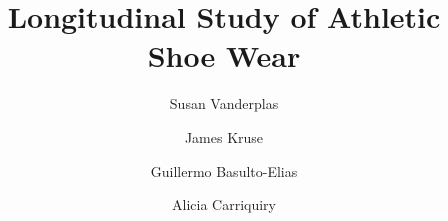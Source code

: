 \title{Longitudinal Study of Athletic Shoe Wear}



%
%


\author[unl,csafe]{Susan Vanderplas}
\author[jkaffil]{James Kruse}
\author[intrans]{Guillermo Basulto-Elias}
\author[csafe,isustat]{Alicia Carriquiry}

\address[unl]{Statistics Department, University of Nebraska Lincoln. 3310 Holdrege St, Lincoln, NE 68503}
\address[csafe]{Center for Statistical Applications in Forensic Evidence, Iowa State University. 613 Morrill Rd, Ames, IA 50011}
\address[jkaffil]{Sociology Department, Iowa State University. 510 Farm House Ln. Ames, IA 50011}
\address[intrans]{Institute for Transportation, Iowa State University. 2711 South Loop Drive, Suite 4700. Ames, IA 50010}
\address[isustat]{Statistics Department, Iowa State University. 2438 Osborne Dr, Ames, IA 50011}
